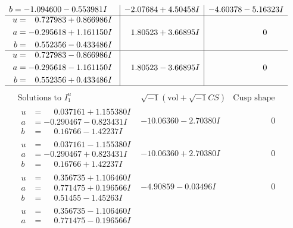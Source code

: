 \documentclass[1p]{elsarticle_modified}
\theoremstyle{definition}
\newcommand{\I}{\sqrt{-1}}
\begin{document}
$$\begin{array}{c|c|c}
\begin{aligned}
b &= -1.094600 - 0.553981 I\end{aligned}
 & -2.07684 + 4.50458 I & -4.60378 - 5.16323 I \\ \hline\begin{aligned}
u &= \phantom{-}0.727983 + 0.866986 I \\
a &= -0.295618 + 1.161150 I \\
b &= \phantom{-}0.552356 - 0.433486 I\end{aligned}
 & \phantom{-}1.80523 + 3.66895 I & \phantom{-0.000000 } 0 \\ \hline\begin{aligned}
u &= \phantom{-}0.727983 - 0.866986 I \\
a &= -0.295618 - 1.161150 I \\
b &= \phantom{-}0.552356 + 0.433486 I\end{aligned}
 & \phantom{-}1.80523 - 3.66895 I & \phantom{-0.000000 } 0\\
 \hline 
 \end{array}$$\newpage$$\begin{array}{c|c|c}  
\text{Solutions to }I^u_{1}& \I (\text{vol} + \sqrt{-1}CS) & \text{Cusp shape}\\
 \hline 
\begin{aligned}
u &= \phantom{-}0.037161 + 1.155380 I \\
a &= -0.290467 - 0.823431 I \\
b &= \phantom{-}0.16766 - 1.42237 I\end{aligned}
 & -10.06360 - 2.70380 I & \phantom{-0.000000 } 0 \\ \hline\begin{aligned}
u &= \phantom{-}0.037161 - 1.155380 I \\
a &= -0.290467 + 0.823431 I \\
b &= \phantom{-}0.16766 + 1.42237 I\end{aligned}
 & -10.06360 + 2.70380 I & \phantom{-0.000000 } 0 \\ \hline\begin{aligned}
u &= \phantom{-}0.356735 + 1.106460 I \\
a &= \phantom{-}0.771475 + 0.196566 I \\
b &= \phantom{-}0.51455 - 1.45263 I\end{aligned}
 & -4.90859 - 0.03496 I & \phantom{-0.000000 } 0 \\ \hline\begin{aligned}
u &= \phantom{-}0.356735 - 1.106460 I \\
a &= \phantom{-}0.771475 - 0.196566 I \\

\end{aligned}
\end{array}$$
\end{document}
